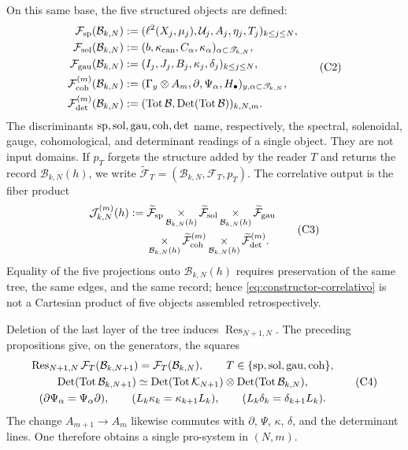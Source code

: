 On this same base, the five structured objects are defined:
\[
\begin{aligned}
 \mathcal F_{\rm sp}(\mathcal B_{k,N})
   &:=(\ell^2(X_j,\mu_j),\mathcal U_j,A_j,\eta_j,T_j)_{k\leq j\leq N},\\
 \mathcal F_{\rm sol}(\mathcal B_{k,N})
   &:=(b,\kappa_{\rm can},C_\alpha,\kappa_\alpha)_{\alpha\subset\mathscr T_{k,N}},\\
 \mathcal F_{\rm gau}(\mathcal B_{k,N})
   &:=(I_j,J_j,B_j,\kappa_j,\delta_j)_{k\leq j\leq N},\\
 \mathcal F_{\rm coh}^{(m)}(\mathcal B_{k,N})
   &:=(\Gamma_y\otimes A_m,\partial,\Psi_\alpha,H_\bullet)_{y,\alpha\subset\mathscr T_{k,N}},\\
 \mathcal F_{\rm det}^{(m)}(\mathcal B_{k,N})
   &:=(\operatorname{Tot}\mathcal B,\operatorname{Det}(\operatorname{Tot}\mathcal B))_{k,N,m}.
\end{aligned}
 \tag{C2}
\]
The discriminants \({\rm sp},{\rm sol},{\rm gau},{\rm coh},{\rm det}\)
name, respectively, the spectral, solenoidal, gauge,
cohomological, and determinant readings of a single object. They are not input domains.
If \(p_T\) forgets the structure added by the reader \(T\) and returns the
record \(\mathcal B_{k,N}(h)\), we write
\(\widetilde{\mathcal F}_T=(\mathcal B_{k,N},\mathcal F_T,p_T)\). The
correlative output is the fiber product
\[
\begin{aligned}
 \mathcal J_{k,N}^{(m)}(h):={}&
 \widetilde{\mathcal F}_{\rm sp}
 \mathop{\times}_{\mathcal B_{k,N}(h)}
 \widetilde{\mathcal F}_{\rm sol}
 \mathop{\times}_{\mathcal B_{k,N}(h)}
 \widetilde{\mathcal F}_{\rm gau}\\
 &\mathop{\times}_{\mathcal B_{k,N}(h)}
 \widetilde{\mathcal F}_{\rm coh}^{(m)}
 \mathop{\times}_{\mathcal B_{k,N}(h)}
 \widetilde{\mathcal F}_{\rm det}^{(m)}.
\end{aligned}
 \tag{C3}
 \label{eq:constructor-correlativo}
\]
Equality of the five projections onto \(\mathcal B_{k,N}(h)\) requires
preservation of the same tree, the same edges, and the same record; hence
\eqref{eq:constructor-correlativo} is not a Cartesian product of five
objects assembled retrospectively.

Deletion of the last layer of the tree induces
\(\operatorname{Res}_{N+1,N}\). The preceding propositions give, on the
generators, the squares
\[
\begin{gathered}
 \operatorname{Res}_{N+1,N}\mathcal F_T(\mathcal B_{k,N+1})
 =\mathcal F_T(\mathcal B_{k,N}),
 \qquad T\in\{{\rm sp},{\rm sol},{\rm gau},{\rm coh}\},\\
 \operatorname{Det}(\operatorname{Tot}\mathcal B_{k,N+1})
 \simeq
 \operatorname{Det}(\operatorname{Tot}\mathcal K_{N+1})
 \otimes
 \operatorname{Det}(\operatorname{Tot}\mathcal B_{k,N}),\\
 (\partial\Psi_\alpha=\Psi_\alpha\partial),\qquad
 (L_k\kappa_k=\kappa_{k+1}L_k),\qquad
 (L_k\delta_k=\delta_{k+1}L_k).
\end{gathered}
 \tag{C4}
 \label{eq:naturalidad-D}
\]
The change \(A_{m+1}\to A_m\) likewise commutes with \(\partial\), \(\Psi\),
\(\kappa\), \(\delta\), and the determinant lines. One therefore obtains
a single pro-system in \((N,m)\).

